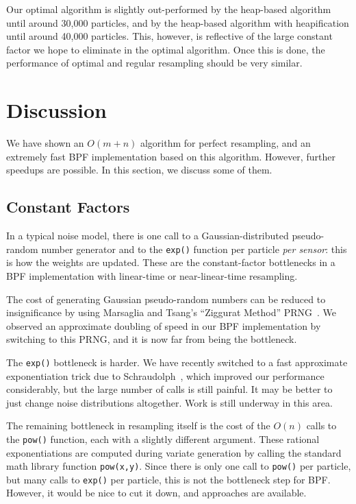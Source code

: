 \documentclass[12pt]{article}
\begin{document}
  Our optimal algorithm is slightly out-performed by the
  heap-based algorithm until around 30,000 particles, and by
  the heap-based algorithm with heapification until around
  40,000 particles.  This, however, is reflective of the
  large constant factor we hope to eliminate in the optimal
  algorithm.  Once this is done, the performance of optimal
  and regular resampling should be very similar.

\section{Discussion}

  We have shown an $O(m + n)$ algorithm for perfect
  resampling, and an extremely fast BPF implementation based
  on this algorithm.  However, further speedups are
  possible.  In this section, we discuss some of them.

\subsection{Constant Factors}

  In a typical noise model, there is one call
  to a Gaussian-distributed pseudo-random number generator
  and to the {\tt exp()} function per particle {\em per
  sensor}: this is how the weights are updated.  These are the
  constant-factor bottlenecks in a BPF implementation with
  linear-time or near-linear-time resampling.

  The cost of generating Gaussian pseudo-random numbers can
  be reduced to insignificance by using Marsaglia and
  Tsang's ``Ziggurat Method'' PRNG~\cite{ziggurat}.  We
  observed an approximate doubling of speed in our BPF
  implementation by switching to this PRNG, and it is now
  far from being the bottleneck.

  The {\tt exp()} bottleneck is harder.  We have recently
  switched to a fast approximate exponentiation trick due to
  Schraudolph~\cite{exp}, which improved our performance
  considerably, but the large number of calls is still
  painful.  It may be better to just change noise
  distributions altogether.  Work is still underway in this
  area.


  The remaining bottleneck in resampling itself is the cost
  of the $O(n)$ calls to the {\tt pow()} function, each with
  a slightly different argument.  These rational
  exponentiations are computed during variate generation by
  calling the standard math library function {\tt pow(x,y)}.
  Since there is only one call to {\tt pow()} per particle,
  but many calls to {\tt exp()} per particle, this is not
  the bottleneck step for BPF.  However, it would be nice to
  cut it down, and approaches are available.
\end{document}
